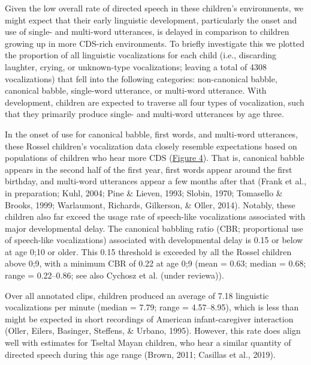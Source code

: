 \documentclass[,man,floatsintext]{apa6}
\begin{document}
Given the low overall rate of directed speech in these children's
environments, we might expect that their early linguistic development,
particularly the onset and use of single- and multi-word utterances, is
delayed in comparison to children growing up in more CDS-rich
environments. To briefly investigate this we plotted the proportion of
all linguistic vocalizations for each child (i.e., discarding laughter,
crying, or unknown-type vocalizations; leaving a total of 4308
vocalizations) that fell into the following categories: non-canonical
babble, canonical babble, single-word utterance, or multi-word
utterance. With development, children are expected to traverse all four
types of vocalization, such that they primarily produce single- and
multi-word utterances by age three.

In the onset of use for canonical babble, first words, and multi-word
utterances, these Rossel children's vocalization data closely resemble
expectations based on populations of children who hear more CDS
(\protect\hyperlink{fig4}{Figure 4}). That is, canonical babble appears
in the second half of the first year, first words appear around the
first birthday, and multi-word utterances appear a few months after that
(Frank et al., in preparation; Kuhl, 2004; Pine \& Lieven, 1993; Slobin,
1970; Tomasello \& Brooks, 1999; Warlaumont, Richards, Gilkerson, \&
Oller, 2014). Notably, these children also far exceed the usage rate of
speech-like vocalizations associated with major developmental delay. The
canonical babbling ratio (CBR; proportional use of speech-like
vocalizations) associated with developmental delay is 0.15 or below at
age 0;10 or older. This 0.15 threshold is exceeded by all the Rossel
children above 0;9, with a minimum CBR of 0.22 at age 0;9 (mean = 0.63;
median = 0.68; range = 0.22--0.86; see also Cychosz et al. (under
reviewa)).

Over all annotated clips, children produced an average of 7.18
linguistic vocalizations per minute (median = 7.79; range = 4.57--8.95),
which is less than might be expected in short recordings of American
infant-caregiver interaction (Oller, Eilers, Basinger, Steffens, \&
Urbano, 1995). However, this rate does align well with estimates for
Tseltal Mayan children, who hear a similar quantity of directed speech
during this age range (Brown, 2011; Casillas et al., 2019).
\end{document}
